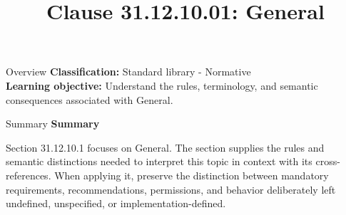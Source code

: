 \documentclass[10pt,letterpaper]{article}
\title{Clause 31.12.10.01: General}
\author{}
\date{}
\begin{document}
\maketitle
\begin{CornellOverviewBox}{Overview}
\textbf{Classification:} Standard library - Normative\\[2pt]
\textbf{Learning objective:} Understand the rules, terminology, and semantic consequences associated with General.
\end{CornellOverviewBox}\begin{CornellSummaryBox}{Summary}
{\sffamily\bfseries\color{Accent} Summary}\par\vspace{3pt}Section 31.12.10.1 focuses on General. The section supplies the rules and semantic distinctions needed to interpret this topic in context with its cross-references. When applying it, preserve the distinction between mandatory requirements, recommendations, permissions, and behavior deliberately left undefined, unspecified, or implementation-defined.
\end{CornellSummaryBox}
\end{document}
